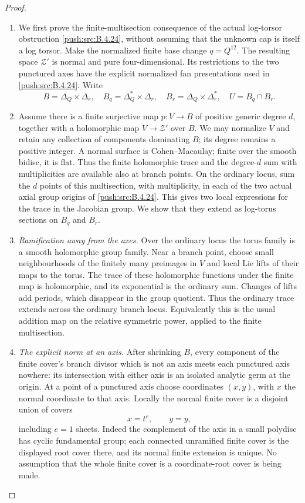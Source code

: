 \begin{proof}
\begin{enumerate}[label=\arabic*.,leftmargin=*]
\item We first prove the finite-multisection consequence of
the actual log-torsor obstruction \ref{push:src:B.4.24}, without
assuming that the unknown cap is itself a log torsor.
Make the normalized finite base change $q=Q^{12}$.
The resulting space $\mathcal Z'$ is normal and
pure four-dimensional. Its restrictions to the two
punctured axes have the explicit normalized fan
presentations used in \ref{push:src:B.4.24}. Write
\[
 B=\Delta_Q\times\Delta_r,\quad
 B_q=\Delta_Q^*\times\Delta_r,\quad
 B_r=\Delta_Q\times\Delta_r^*,\quad
 U=B_q\cap B_r.
\]

\item Assume there is a finite surjective map
$p:V\to B$ of positive generic degree $d$, together
with a holomorphic map $V\to\mathcal Z'$ over $B$.
We may normalize $V$ and retain any collection of
components dominating $B$; its degree remains a
positive integer. A normal surface is Cohen--Macaulay;
finite over the smooth bidisc, it is flat. Thus the
finite holomorphic trace and the degree-$d$ sum with
multiplicities are available also at branch points.
On the ordinary locus, sum the
$d$ points of this multisection, with multiplicity,
in each of the two actual axial group origins of
\ref{push:src:B.4.24}. This gives two local expressions for the
trace in the Jacobian group. We show that they
extend as log-torus sections on $B_q$ and $B_r$.

\item \emph{Ramification away from the axes.}
Over the ordinary locus the torus family is a smooth
holomorphic group family. Near a branch point, choose
small neighbourhoods of the finitely many preimages
in $V$ and local Lie lifts of their maps to the torus.
The trace of these holomorphic functions under the
finite map is holomorphic, and its exponential is
the ordinary sum. Changes of lifts add periods,
which disappear in the group quotient. Thus the
ordinary trace extends across the ordinary branch
locus. Equivalently this is the usual addition map
on the relative symmetric power, applied to the
finite multisection.

\item \emph{The explicit norm at an axis.}
After shrinking $B$, every component of the finite
cover's branch divisor which is not an axis meets
each punctured axis nowhere: its intersection with
either axis is an isolated analytic germ at the
origin. At a point of a punctured axis choose
coordinates $(x,y)$, with $x$ the normal coordinate
to that axis. Locally the normal finite cover is
a disjoint union of covers
\[
 x=t^e,\qquad y=y,
 \tag{B.4.26.1}
\]
including $e=1$ sheets. Indeed the complement of
the axis in a small polydisc has cyclic fundamental
group; each connected unramified finite cover is
the displayed root cover there, and its normal
finite extension is unique. No assumption that the
whole finite cover is a coordinate-root cover is
being made.


\end{enumerate}
\end{proof}
